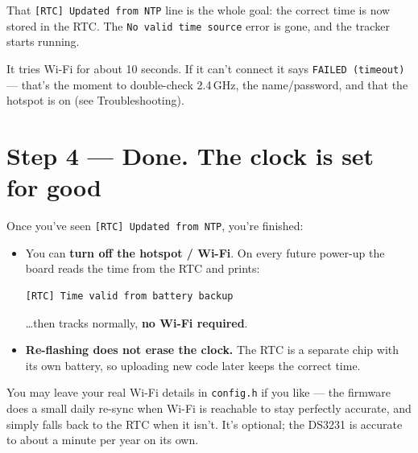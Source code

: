 \documentclass[11pt]{article}
\begin{document}
That \texttt{[RTC] Updated from NTP} line is the whole goal: the correct time is now
stored in the RTC. The \texttt{No valid time source} error is gone, and the tracker
starts running.

\begin{tip}
It tries Wi-Fi for about 10 seconds. If it can't connect it says
\texttt{FAILED (timeout)} --- that's the moment to double-check 2.4\,GHz, the
name/password, and that the hotspot is on (see Troubleshooting).
\end{tip}

\section{Step 4 --- Done. The clock is set for good}
Once you've seen \texttt{[RTC] Updated from NTP}, you're finished:
\begin{itemize}[leftmargin=1.6em]
  \item You can \textbf{turn off the hotspot / Wi-Fi}. On every future power-up the
        board reads the time from the RTC and prints:
\begin{lstlisting}
[RTC] Time valid from battery backup
\end{lstlisting}
        \ldots then tracks normally, \textbf{no Wi-Fi required}.
  \item \textbf{Re-flashing does not erase the clock.} The RTC is a separate chip
        with its own battery, so uploading new code later keeps the correct time.
\end{itemize}

\begin{tip}
You may leave your real Wi-Fi details in \texttt{config.h} if you like --- the
firmware does a small daily re-sync when Wi-Fi is reachable to stay perfectly
accurate, and simply falls back to the RTC when it isn't. It's optional; the DS3231
is accurate to about a minute per year on its own.
\end{tip}

\end{document}
